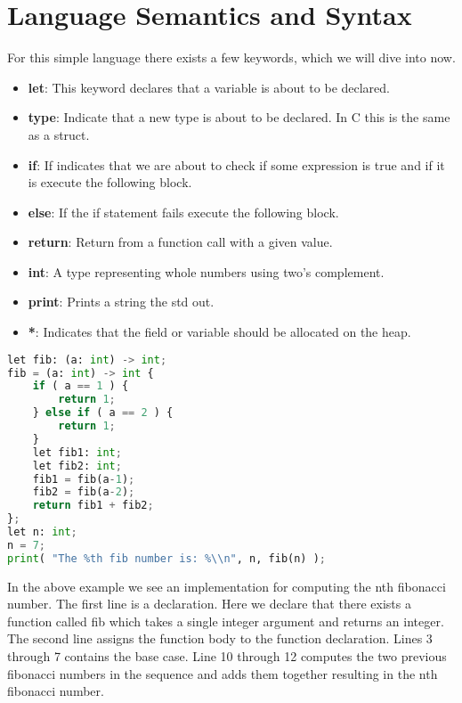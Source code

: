 \section*{Language Semantics and Syntax}
For this simple language there exists a few keywords, which we will dive into now.

\begin{itemize}
  \item \textbf{let}: This keyword declares that a variable is about to be declared.
  \item \textbf{type}: Indicate that a new type is about to be declared. In C this is the same as a struct.
  \item \textbf{if}: If indicates that we are about to check if some expression is true and if it is execute the following block.
  \item \textbf{else}: If the if statement fails execute the following block.
  \item \textbf{return}: Return from a function call with a given value.
  \item \textbf{int}: A type representing whole numbers using two's complement.
  \item \textbf{print}: Prints a string the std out.
  \item \textbf{*}: Indicates that the field or variable should be allocated on the heap.
\end{itemize}

\newpage

\begin{lstlisting}[language=Python,title=Fibonacci Example]
let fib: (a: int) -> int;
fib = (a: int) -> int {
    if ( a == 1 ) {
        return 1;
    } else if ( a == 2 ) {
        return 1;
    }
    let fib1: int;
    let fib2: int;
    fib1 = fib(a-1);
    fib2 = fib(a-2);
    return fib1 + fib2; 
};
let n: int;
n = 7;
print( "The %th fib number is: %\\n", n, fib(n) );
\end{lstlisting}

In the above example we see an implementation for computing the nth fibonacci number. The first line is a declaration. Here we declare that there exists a function called fib which takes a single integer argument and returns an integer. The second line assigns the function body to the function declaration. Lines 3 through 7 contains the base case. Line 10 through 12 computes the two previous fibonacci numbers in the sequence and adds them together resulting in the nth fibonacci number. 